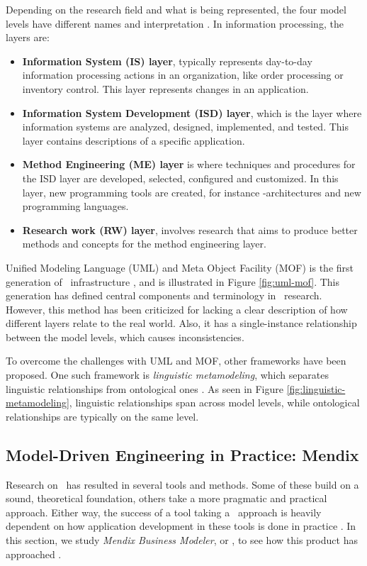 Depending on the research field and what is being represented, the four model levels have different names and interpretation \cite{Leppanen2006-ay}. In information processing, the layers are:
\begin{itemize}
    \item \textbf{Information System (IS) layer}, typically represents day-to-day information processing actions in an organization, like order processing or inventory control. This layer represents changes in an application.
    \item \textbf{Information System Development (ISD) layer}, which is the layer where information systems are analyzed, designed, implemented, and tested. This layer contains descriptions of a specific application.
    \item \textbf{Method Engineering (ME) layer} is where techniques and procedures for the ISD layer are developed, selected, configured and customized. In this layer, new programming tools are created, for instance \mdd-architectures and new programming languages.
    \item \textbf{Research work (RW) layer}, involves research that aims to produce better methods and concepts for the method engineering layer.
\end{itemize}

Unified Modeling Language (UML) and Meta Object Facility (MOF) is the first generation of \mdd~infrastructure \cite{Atkinson2003-wr}, and is illustrated in Figure \ref{fig:uml-mof}. This generation has defined central components and terminology in \mde~research. However, this method has been criticized for lacking a clear description of how different layers relate to the real world. Also, it has a single-instance relationship between the model levels, which causes inconsistencies.

To overcome the challenges with UML and MOF, other frameworks have been proposed. One such framework is \textit{linguistic metamodeling}, which separates linguistic relationships from ontological ones \cite{Atkinson2003-wr}. As seen in Figure \ref{fig:linguistic-metamodeling}, linguistic relationships span across model levels, while ontological relationships are typically on the same level. 

\subsection{Model-Driven Engineering in Practice: Mendix}
\label{sub:Model-Driven Engineering in Practice: Mendix}
Research on \mde~has resulted in several tools and methods. Some of these build on a sound, theoretical foundation, others take a more pragmatic and practical approach. Either way, the success of a tool taking a \mdd~approach is heavily dependent on how application development in these tools is done in practice \cite{Henkel2010-sy}. In this section, we study \textit{Mendix Business Modeler}, or \mendix, to see how this product has approached \mde. 

